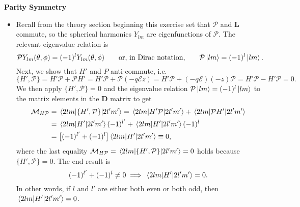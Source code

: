 \documentclass[11pt, a4paper]{article}
\newcommand{\eqtext}[1]{\qquad \text{#1} \qquad}
\renewcommand{\vec}[1]{\bm{#1}} %
\newcommand{\mat}[1]{\mathbf{#1}} %
\newcommand{\E}{\mathcal{E}}  %
\renewcommand{\P}{\mathcal{P}}  %
\begin{document}
\textbf{Parity Symmetry}
\begin{itemize}
	\item Recall from the theory section beginning this exercise set that $ \P $ and $ \vec{L} $ commute, so the spherical harmonics $ Y_{lm} $ are eigenfunctions of $ \P $. The relevant eigenvalue relation is
	\begin{equation*}
		\P Y_{lm}(\theta, \phi) = (-1)^{l}Y_{lm}(\theta, \phi) \eqtext{or, in Dirac notation,} \P\ket{lm} = (-1)^{l}\ket{lm}.
	\end{equation*}
	Next, we show that $ H' $ and $ P $ anti-commute, i.e. 
	\begin{equation*}
		\{H', \P \} = H'\P + \P H' = H' \P + \P(-q \E z) = H' \P + (-q\E)(-z)\P  = H' \P - H'\P = 0.
	\end{equation*}
	We then apply $ \{H', \P \} = 0 $ and the eigenvalue relation $  \P\ket{lm} = (-1)^{l}\ket{lm} $ to the matrix elements in the $ \mat{D} $ matrix to get
	\begin{align*}
		\mathcal{M}_{H\P} & = \mel{2lm}{\{H', \P\}}{2l'm'} = \mel{2lm}{H' \P}{2l'm'} + \mel{2lm}{\P H'}{2l'm'}\\
		& = \mel{2lm}{H'}{2l'm'} (-1)^{l'} + \mel{2lm}{H'}{2l'm'}(-1)^{l}\\
		& = \big[(-1)^{l'} + (-1)^{l}\big]\mel{2lm}{H'}{2l'm'} \equiv 0,
	\end{align*}
	where the last equality $ \mathcal{M}_{H\P} = \mel{2lm}{\{H', \P\}}{2l'm'} = 0 $ holds because $  \{H', \P \} = 0 $. The end result is
	\begin{equation*}
		(-1)^{l'} + (-1)^{l} \neq 0 \implies \mel{2lm}{H'}{2l'm'} = 0.
	\end{equation*}
	In other words, if $ l $ and $ l' $ are either both even or both odd, then $ \mel{2lm}{H'}{2l'm'} = 0 $.
	

\end{itemize}
\end{document}
